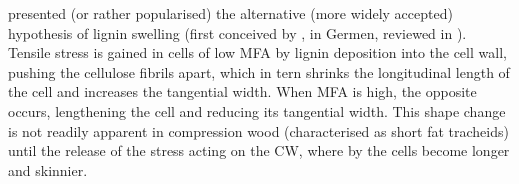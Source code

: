\cite{Boyd_1972} presented (or rather popularised) the alternative (more widely
accepted) hypothesis of lignin swelling (first conceived by \cite{munch1938}, in Germen, reviewed in \cite{Boyd_1972}). Tensile
stress is gained in cells of low MFA by lignin deposition into the cell wall,
pushing the cellulose fibrils apart, which in tern shrinks the longitudinal
length of the cell and increases the tangential width. When MFA is high, the
opposite occurs, lengthening the cell and reducing its tangential width. This
shape change is not readily apparent in compression wood (characterised as short fat
tracheids) until the release of the stress acting on the CW, where by the cells
become longer and skinnier.
